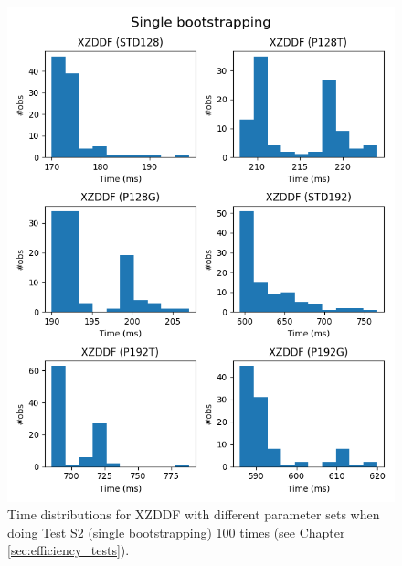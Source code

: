 \begin{figure}[ht]
    \centering
    \includegraphics[width=\textwidth]{data/figures/Single_bootstrapping_distributions_2.png}
    \caption{Time distributions for XZDDF with different parameter sets when doing Test S2 (single bootstrapping) 100 times (see Chapter \ref{sec:efficiency_tests}).}
    \label{fig:distr_single_bootstrap2}
\end{figure}


